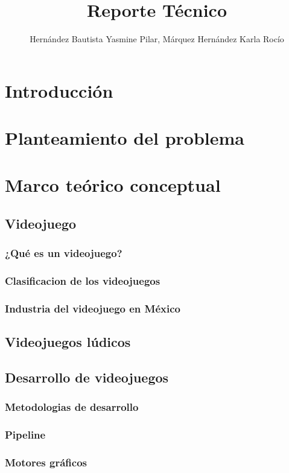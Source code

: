 \documentclass[11pt,letterpaper]{article}
\begin{document}
	\author{Hernández Bautista Yasmine Pilar, Márquez 		Hernández Karla Rocío}
	\title{Reporte Técnico}
	\maketitle
	\tableofcontents
	\section{Introducción}
	\section{Planteamiento del problema}
	
	\section{Marco teórico conceptual}
		\subsection{Videojuego}
			\subsubsection{¿Qué es un videojuego?}
			\subsubsection{Clasificacion de los videojuegos}
			\subsubsection{Industria del videojuego en México}	
		\subsection{Videojuegos lúdicos}		
		\subsection{Desarrollo de videojuegos}
			\subsubsection{Metodologias de desarrollo}
			\subsubsection{Pipeline}
			\subsubsection{Motores gráficos}
\end{document}
